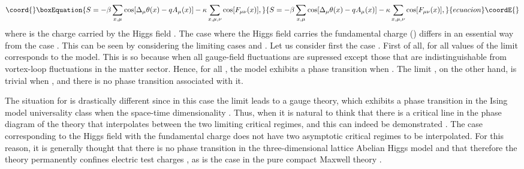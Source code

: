 \documentclass[a4paper,showpacs,preprintnumbers,amsmath,amssymb,prl,twocolumn]{revtex4}
\begin{document}
\begin{equation}\coord{}\boxEquation{
\label{Higgs}
S=-\beta\sum_{x,\mu}\cos[\Delta_\mu\theta(x)-qA_\mu(x)]
-\kappa\sum_{x,\mu,\nu}\cos[F_{\mu\nu}(x)],
}{
S=-\beta\sum_{x,\mu}\cos[\Delta_\mu\theta(x)-qA_\mu(x)]
-\kappa\sum_{x,\mu,\nu}\cos[F_{\mu\nu}(x)],
}{ecuacion}\coordE{}\end{equation}
where \coordHE{} is the charge carried by the Higgs field . 
The case where the Higgs field carries the 
fundamental charge (\coordHE{}) differs 
in an essential way from the case \coordHE{}. 
This can be seen by considering the limiting cases \myHighlight{$\beta\to\infty$}\coordHE{} 
and \myHighlight{$\kappa\to\infty$}\coordHE{}. Let us consider first the case \coordHE{}. First 
of all, for all values of \coordHE{} the limit \myHighlight{$\kappa\to\infty$}\coordHE{} corresponds 
to the \coordHE{} model. This is so because when \myHighlight{$\kappa \to \infty$}\coordHE{}
all gauge-field fluctuations are supressed except those that 
are indistinguishable from vortex-loop fluctuations in the matter 
sector. Hence, for all \coordHE{}, the model exhibits a phase transition 
when \myHighlight{$\kappa \to \infty$}\coordHE{}. The limit \myHighlight{$\beta\to\infty$}\coordHE{}, on the other hand, 
is trivial when \coordHE{}, and there is no phase transition associated with 
it. 

The situation for \coordHE{} is drastically different since in this 
case the limit \myHighlight{$\beta\to\infty$}\coordHE{} leads to a \coordHE{} gauge theory, 
which exhibits a phase transition in the Ising model universality class 
when the space-time dimensionality \coordHE{}. Thus, when \coordHE{} it is natural 
to think that there is a critical line in the phase diagram of the \coordHE{} 
theory that interpolates between the two limiting critical regimes, and 
this can indeed be demonstrated \cite{Bhanot,Sudbo,Smiseth}. The case 
corresponding to the Higgs field with the 
fundamental charge does not have two asymptotic critical regimes 
to be interpolated. For this reason, it is generally thought that there 
is no phase transition in the \coordHE{} three-dimensional lattice Abelian Higgs 
model and that therefore the theory permanently confines electric test 
charges \cite{FradShe}, as is the case in the pure compact Maxwell theory 
\cite{Polyakov}.
\end{document}
